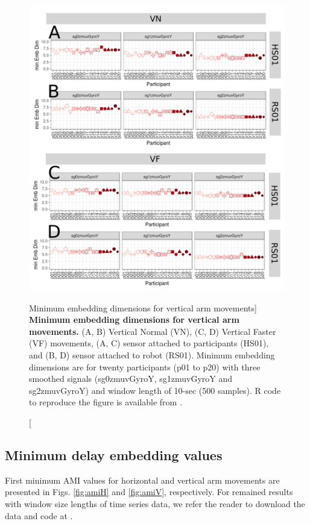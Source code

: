 \begin{figure}
\centering
\includegraphics[width=1.0\textwidth]{cao_aVw10}
	\caption
	[Minimum embedding dimensions for vertical arm movements]{
	{\bf Minimum embedding dimensions for vertical arm movements.} 
		(A, B) Vertical Normal (VN), (C, D) Vertical Faster (VF) 
		movements,
		(A, C) sensor attached to participants (HS01), and		
		(B, D) sensor attached to robot (RS01).
		Minimum embedding dimensions are for twenty participants 
		(p01 to p20) with three smoothed signals (sg0zmuvGyroY, 
		sg1zmuvGyroY and sg2zmuvGyroY) 
		and window length of 10-sec (500 samples).
		R code to reproduce the figure is available 
		from \cite{hwum2018}.
        }
    \label{fig:caoV}
\end{figure}


\newpage
\subsection{Minimum delay embedding values}
First minimum AMI values for horizontal and vertical arm movements
are presented in Figs.  \ref{fig:amiH} and \ref{fig:amiV}, respectively.
For remained  results with window size lengths of time series data, we refer
the reader to download the data and code at \cite{hwum2018}.

